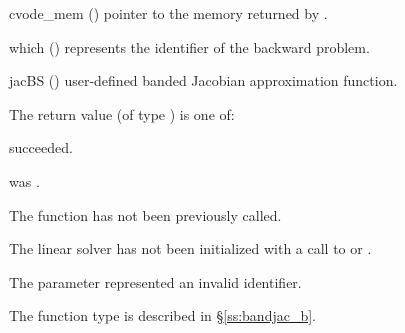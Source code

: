 {
  \begin{args}
  \item[cvode\_mem] ()
    pointer to the {\cvodes} memory returned by .
  \item[which] ()
    represents the identifier of the backward problem.
  \item[jacBS] ()
    user-defined banded Jacobian approximation function.
  \end{args}
}
{
  The return value  (of type ) is one of:
  \begin{args}
  \item[\Id{CVDLS\_SUCCESS}] 
     succeeded.
  \item[\Id{CVDLS\_MEM\_NULL}]
     was .
  \item[\Id{CVDLS\_NO\_ADJ}]
    The function  has not been previously called.
  \item[\Id{CVDLS\_LMEM\_NULL}]
    The linear solver has not been initialized with a call to 
    or .
  \item[\Id{CVDLS\_ILL\_INPUT}]
    The parameter  represented an invalid identifier.
  \end{args}
}
{
  The function type  is described in \S\ref{ss:bandjac_b}.
}


